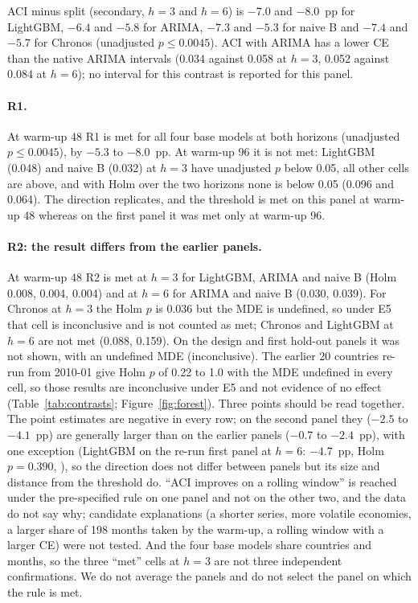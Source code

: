 ACI minus split (secondary, $h=3$ and $h=6$) is $-7.0$ and $-8.0$~pp for LightGBM, $-6.4$ and $-5.8$ for ARIMA, $-7.3$ and $-5.3$ for naive B and $-7.4$ and $-5.7$ for Chronos (unadjusted $p\le 0.0045$). ACI with ARIMA has a lower CE than the native ARIMA intervals (0.034 against 0.058 at $h=3$, 0.052 against 0.084 at $h=6$); no interval for this contrast is reported for this panel.

\paragraph{R1.} At warm-up 48 R1 is met for all four base models at both horizons (unadjusted $p\le 0.0045$), by $-5.3$ to $-8.0$~pp. At warm-up 96 it is not met: LightGBM (0.048) and naive B (0.032) at $h=3$ have unadjusted $p$ below 0.05, all other cells are above, and with Holm over the two horizons none is below 0.05 (0.096 and 0.064). The direction replicates, and the threshold is met on this panel at warm-up 48 whereas on the first panel it was met only at warm-up 96.

\paragraph{R2: the result differs from the earlier panels.} At warm-up 48 R2 is met at $h=3$ for LightGBM, ARIMA and naive B (Holm 0.008, 0.004, 0.004) and at $h=6$ for ARIMA and naive B (0.030, 0.039). For Chronos at $h=3$ the Holm $p$ is 0.036 but the MDE is undefined, so under E5 that cell is inconclusive and is not counted as met; Chronos and LightGBM at $h=6$ are not met (0.088, 0.159). On the design and first hold-out panels it was not shown, with an undefined MDE (inconclusive). The earlier 20 countries re-run from 2010-01 give Holm $p$ of 0.22 to 1.0 with the MDE undefined in every cell, so those results are inconclusive under E5 and not evidence of no effect (Table~\ref{tab:contrasts}; Figure~\ref{fig:forest}). Three points should be read together. The point estimates are negative in every row; on the second panel they ($-2.5$ to $-4.1$~pp) are generally larger than on the earlier panels ($-0.7$ to $-2.4$~pp), with one exception (LightGBM on the re-run first panel at $h=6$: $-4.7$~pp, Holm $p=0.390$, ), so the direction does not differ between panels but its size and distance from the threshold do. ``ACI improves on a rolling window'' is reached under the pre-specified rule on one panel and not on the other two, and the data do not say why; candidate explanations (a shorter series, more volatile economies, a larger share of 198 months taken by the warm-up, a rolling window with a larger CE) were not tested. And the four base models share countries and months, so the three ``met'' cells at $h=3$ are not three independent confirmations. We do not average the panels and do not select the panel on which the rule is met.

